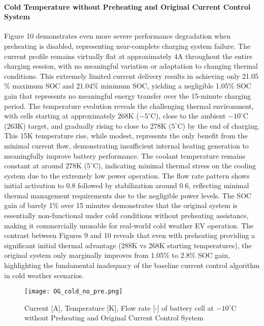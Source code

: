 \documentclass[conference]{IEEEtran}
\begin{document}
\paragraph{\textbf{Cold Temperature without Preheating and Original Current Control System}}
Figure 10 demonstrates even more severe performance degradation when preheating is disabled, representing near-complete charging system failure. The current profile remains virtually flat at approximately 4A throughout the entire charging session, with no meaningful variation or adaptation to changing thermal conditions. This extremely limited current delivery results in achieving only 21.05$\%$ maximum SOC and 21.04$\%$ minimum SOC, yielding a negligible 1.05$\%$ SOC gain that represents no meaningful energy transfer over the 15-minute charging period.
The temperature evolution reveals the challenging thermal environment, with cells starting at approximately 268K ($-5^\circ$C), close to the ambient $-10^\circ$C (263K) target, and gradually rising to close to 278K ($5^\circ$C) by the end of charging. This 15K temperature rise, while modest, represents the only benefit from the minimal current flow, demonstrating insufficient internal heating generation to meaningfully improve battery performance. The coolant temperature remains constant at around 278K ($5^\circ$C), indicating minimal thermal stress on the cooling system due to the extremely low power operation.
The flow rate pattern shows initial activation to 0.8 followed by stabilization around 0.6, reflecting minimal thermal management requirements due to the negligible power levels. The SOC gain of barely 1$\%$ over 15 minutes demonstrates that the original system is essentially non-functional under cold conditions without preheating assistance, making it commercially unusable for real-world cold weather EV operation.
The contrast between Figures 9 and 10 reveals that even with preheating providing a significant initial thermal advantage (288K vs 268K starting temperatures), the original system only marginally improves from 1.05$\%$ to 2.8$\%$ SOC gain, highlighting the fundamental inadequacy of the baseline current control algorithm in cold weather scenarios.

\begin{figure}[H]
    \centering
    \texttt{[image: OG\_cold\_no\_pre.png]}
    \caption{Current [A], Temperature [K], Flow rate [-] of battery cell at $-10^\circ$C without Preheating and Original Current Control System }
    \label{fig:enter-label}
\end{figure}
\end{document}
